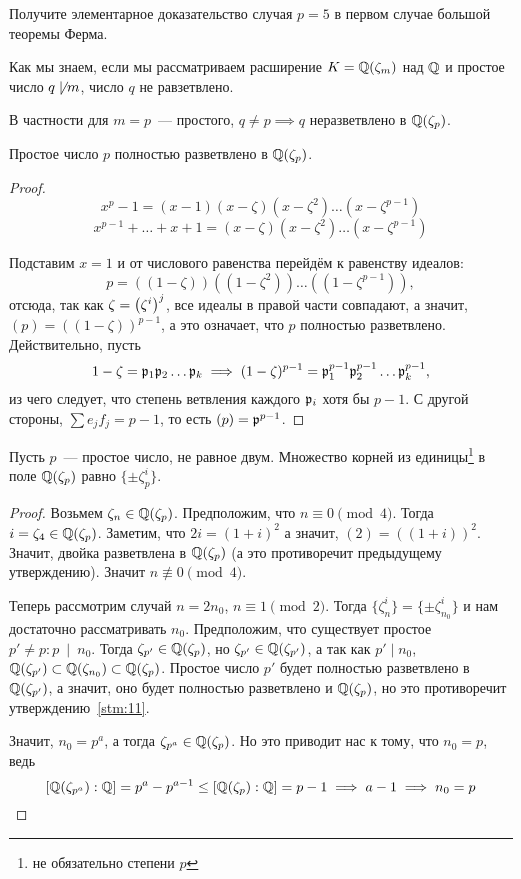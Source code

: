	\begin{homework}
		Получите элементарное доказательство случая $p = 5$ в первом случае большой теоремы Ферма. 
	\end{homework}

	Как мы знаем, если мы рассматриваем расширение $K = \Q(\zeta_m)$ над $\Q$ и простое число $q \not \mid m$, число $q$ не равзетвлено. 

	В частности для $m = p$~--- простого, $q \neq p \implies q$ неразветвлено в $\Q(\zeta_p)$.

	\begin{statement}\label{stm:11} 
		Простое число $p$ полностью разветвлено в $\Q(\zeta_{p})$.
	\end{statement}
	\begin{proof}
		\[
	 	x^p - 1 = (x - 1)(x - \zeta)(x - \zeta^2)\ldots(x - \zeta^{p - 1})
	 \] 
	 \[
	 	x^{p - 1} + \ldots + x + 1 = (x - \zeta)(x - \zeta^2)\ldots(x - \zeta^{p - 1})
 	 \]

 	 Подставим $x = 1$ и от числового равенства перейдём к равенству идеалов: 
 	 \[
 	 	p = ((1 - \zeta))((1 - \zeta^2))\ldots((1 - \zeta^{p - 1})),
 	 \]
 	 отсюда, так как $\zeta = \lr*{\zeta^i}^j$, все идеалы в правой части совпадают, а значит, $(p) = ((1 - \zeta))^{p - 1}$, а это означает, что $p$ полностью разветвлено. Действительно, пусть 
 	 \[
 	 	1 - \zeta = \fp_{1}\fp_{2} \ldots \fp_{k} \implies (1 - \zeta)^{p - 1} = \fp_{1}^{p - 1}\fp_{2}^{p - 1} \ldots \fp_{k}^{p - 1},
 	 \]
 	 из чего следует, что степень ветвления каждого $\fp_i$ хотя бы $p - 1$. С другой стороны, $\sum e_j f_j = p - 1$, то есть $(p) = \fp^{p - 1}$.
	\end{proof}

	\begin{lemma} 
		Пусть $p$~--- простое число, не равное двум. Множество корней из единицы\footnote{не обязательно степени $p$} в поле $\Q(\zeta_{p})$ равно $\{ \pm \zeta_{p}^{i} \}.$
	\end{lemma}
	\begin{proof}
		Возьмем $\zeta_n \in \Q(\zeta_{p})$. Предположим, что $n \equiv 0 \pmod{4}$. Тогда $i = \zeta_{4} \in \Q(\zeta_{p})$. Заметим, что $2i = (1 + i)^2$ а значит, $(2) = ((1 + i))^2$. Значит, двойка разветвлена в $\Q(\zeta_{p})$ (а это противоречит предыдущему утверждению). Значит $n \not\equiv 0 \pmod{4}$. 

		Теперь рассмотрим случай  $n = 2n_{0}$, $n \equiv 1 \pmod{2}$. Тогда $\{\zeta^{i}_{n}\} = \{ \pm \zeta_{n_0}^{i}\}$ и нам достаточно рассматривать $n_0$. Предположим, что существует простое $p' \neq p \colon p \ \mid \ n_0$. Тогда $\zeta_{p'} \in \Q(\zeta_{p})$, но $\zeta_{p'} \in \Q(\zeta_{p'})$, а так как $p' \mid n_0$, $\Q(\zeta_{p'}) \subset \Q(\zeta_{n_0}) \subset \Q(\zeta_{p})$. Простое число $p'$ будет полностью разветвлено в $\Q(\zeta_{p'})$, а значит, оно будет полностью разветвлено и $\Q(\zeta_{p})$, но это противоречит утверждению~\ref{stm:11}.
		

		Значит, $n_0 = p^a$, а тогда $\zeta_{p^{a}} \in \Q(\zeta_{p})$. Но это приводит нас к тому, что $n_0 = p$, ведь 
		\[
			[\Q(\zeta_{p^{a}}) : \Q] = p^{a} - p^{a - 1} \le [\Q(\zeta_{p}) : \Q] = p - 1 \implies a - 1 \implies n_0 = p 
		\]
	\end{proof}

